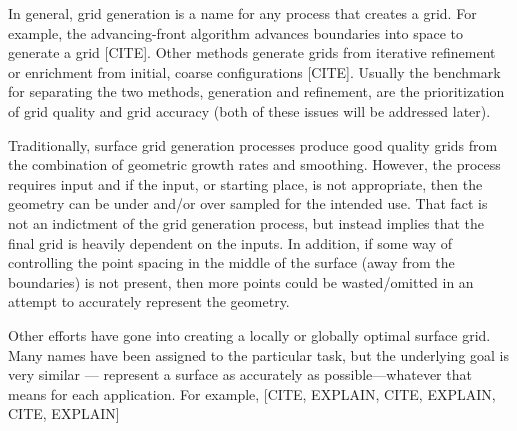 In general, grid generation is a name for any process that creates a
grid. For example, the advancing-front algorithm advances boundaries
into space to generate a grid \cite{tristrano98, diaz-morcillo98}[CITE].
Other methods generate grids from iterative refinement or enrichment
from initial, coarse configurations \cite{marcum98, marcum00,
shewchuk02}[CITE]. Usually the benchmark for separating the two
methods, generation and refinement, are the prioritization of grid
quality and grid accuracy (both of these issues will be addressed
later).

Traditionally, surface grid generation processes produce good quality grids from the combination of geometric growth rates and smoothing. However, the process requires input and if the input, or starting place, is not appropriate, then the geometry can be under and/or over sampled for the intended use. That fact is not an indictment of the grid generation process, but instead implies that the final grid is heavily dependent on the inputs. In addition, if some way of controlling the point spacing in the middle of the surface (away from the boundaries) is not present, then more points could be wasted/omitted in an attempt to accurately represent the geometry.

Other efforts have gone into creating a locally or globally optimal surface grid. Many names have been assigned to the particular task, but the underlying goal is very similar --- represent a surface as accurately as possible---whatever that means for each application. For example, [CITE, EXPLAIN, CITE, EXPLAIN, CITE, EXPLAIN]
